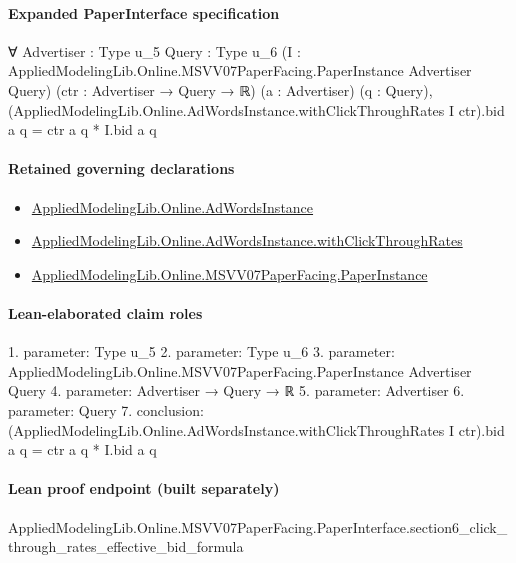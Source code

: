 \documentclass[10pt]{article}
\begin{document}
\paragraph{Expanded PaperInterface specification}
\begin{ReviewVerbatim}
∀ {Advertiser : Type u_5} {Query : Type u_6}
  (I : AppliedModelingLib.Online.MSVV07PaperFacing.PaperInstance Advertiser Query) (ctr : Advertiser → Query → ℝ)
  (a : Advertiser) (q : Query),
  (AppliedModelingLib.Online.AdWordsInstance.withClickThroughRates I ctr).bid a q = ctr a q * I.bid a q
\end{ReviewVerbatim}

\paragraph{Retained governing declarations}
\begin{itemize}\raggedright
\item \hyperlink{governing-declaration-e5ce49672bf26ab1}{Applied\allowbreak{}Modeling\allowbreak{}Lib.\allowbreak{}Online.\allowbreak{}Ad\allowbreak{}Words\allowbreak{}Instance}
\item \hyperlink{governing-declaration-6cf0d8e5f275eabb}{Applied\allowbreak{}Modeling\allowbreak{}Lib.\allowbreak{}Online.\allowbreak{}Ad\allowbreak{}Words\allowbreak{}Instance.\allowbreak{}with\allowbreak{}Click\allowbreak{}Through\allowbreak{}Rates}
\item \hyperlink{governing-declaration-11907576ec71eeb5}{Applied\allowbreak{}Modeling\allowbreak{}Lib.\allowbreak{}Online.\allowbreak{}MSVV07\allowbreak{}Paper\allowbreak{}Facing.\allowbreak{}Paper\allowbreak{}Instance}
\end{itemize}
\paragraph{Lean-elaborated claim roles}\begin{ReviewVerbatim}
1. parameter: Type u_5
2. parameter: Type u_6
3. parameter: AppliedModelingLib.Online.MSVV07PaperFacing.PaperInstance Advertiser Query
4. parameter: Advertiser → Query → ℝ
5. parameter: Advertiser
6. parameter: Query
7. conclusion: (AppliedModelingLib.Online.AdWordsInstance.withClickThroughRates I ctr).bid a q = ctr a q * I.bid a q
\end{ReviewVerbatim}

\paragraph{Lean proof endpoint (built separately)}\begin{ReviewVerbatim}
AppliedModelingLib.Online.MSVV07PaperFacing.PaperInterface.section6_click_through_rates_effective_bid_formula
\end{ReviewVerbatim}
\end{document}
